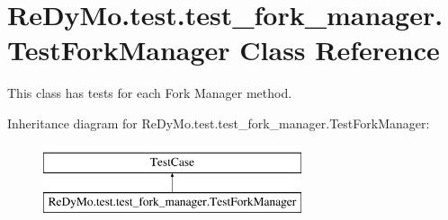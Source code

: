 \hypertarget{classReDyMo_1_1test_1_1test__fork__manager_1_1TestForkManager}{}\section{Re\+Dy\+Mo.\+test.\+test\+\_\+fork\+\_\+manager.\+Test\+Fork\+Manager Class Reference}
\label{classReDyMo_1_1test_1_1test__fork__manager_1_1TestForkManager}


This class has tests for each Fork Manager method.  


Inheritance diagram for Re\+Dy\+Mo.\+test.\+test\+\_\+fork\+\_\+manager.\+Test\+Fork\+Manager\+:\begin{figure}[H]
\begin{center}
\leavevmode
\includegraphics[height=2.000000cm]{classReDyMo_1_1test_1_1test__fork__manager_1_1TestForkManager}
\end{center}
\end{figure}
